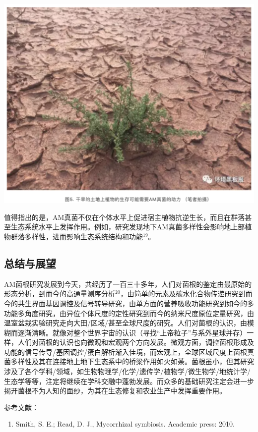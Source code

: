 \documentclass[
]{book}
\providecommand{\tightlist}{%
  \setlength{\itemsep}{0pt}\setlength{\parskip}{0pt}}
\begin{document}
\includegraphics[width=6.67in]{images/am5}

值得指出的是，AM真菌不仅在个体水平上促进宿主植物抗逆生长，而且在群落甚至生态系统水平上发挥作用。例如，研究发现地下AM真菌多样性会影响地上部植物群落多样性，进而影响生态系统结构和功能\(^{19}\)。

\hypertarget{ux603bux7ed3ux4e0eux5c55ux671b}{%
\subsection{总结与展望}\label{ux603bux7ed3ux4e0eux5c55ux671b}}

AM菌根研究发展到今天，共经历了一百三十多年，人们对菌根的鉴定由最原始的形态分析，到而今的高通量测序分析\(^{20}\)，由简单的元素及碳水化合物传递研究到而今的共生界面基因调控及信号转导研究，由单方面的营养吸收功能研究到如今的多功能多角度研究，由异位个体尺度的定性研究到而今的纳米尺度原位定量研究，由温室盆栽实验研究走向大田/区域/甚至全球尺度的研究。人们对菌根的认识，由模糊而逐渐清晰。就像对整个世界宇宙的认识（寻找``上帝粒子''与系外星球并存）一样，人们对菌根的认识也向微观和宏观两个方向发展。微观方面，调控菌根形成及功能的信号传导/基因调控/蛋白解析渐入佳境，而宏观上，全球区域尺度上菌根真菌多样性及其在连接地上地下生态系中的桥梁作用如火如荼。菌根虽小，但其研究涉及了各个学科/领域，如生物物理学/化学/遗传学/植物学/微生物学/地统计学/生态学等等，注定将继续在学科交融中蓬勃发展。而众多的基础研究注定会进一步揭开菌根不为人知的面纱，为其在生态修复和农业生产中发挥重要作用。

参考文献：

\begin{enumerate}
\def\labelenumi{\arabic{enumi}.}
\tightlist
\item
  Smith, S. E.; Read, D. J., Mycorrhizal symbiosis. Academic press: 2010.
\end{enumerate}
\end{document}
